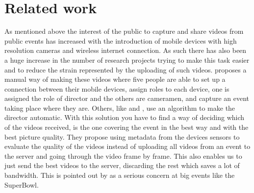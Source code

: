 \documentclass[conference]{IEEEtran}
\begin{document}
%


\section{Related work}
As mentioned above the interest of the public to capture and share videos from public events has increased with the introduction of mobile devices with high resolution cameras and wireless internet connection. As such there has also been a huge increase in the number of research projects trying to make this task easier and to reduce the strain represented by the uploading of such videos. \cite{engstrom_mobile_2012} proposes a manual way of making these videos where five people are able to set up a connection between their mobile devices, assign roles to each device, one is assigned the role of director and the others are cameramen, and capture an event taking place where they are.
Others, like \cite{seshadri_demand_2014} and \cite{shrestha_automatic_2010}, use an algorithm to make the director automatic. With this solution you have to find a way of deciding which of the videos received, is the one covering the event in the best way and with the best picture quality. They propose using metadata from the devices sensors to evaluate the quality of the videos instead of uploading all videos from an event to the server and going through the video frame by frame. This also enables us to just send the best videos to the server, discarding the rest which saves a lot of bandwidth. This is pointed out by \cite{seshadri_demand_2014} as a serious concern at big events like the SuperBowl.
\end{document}

